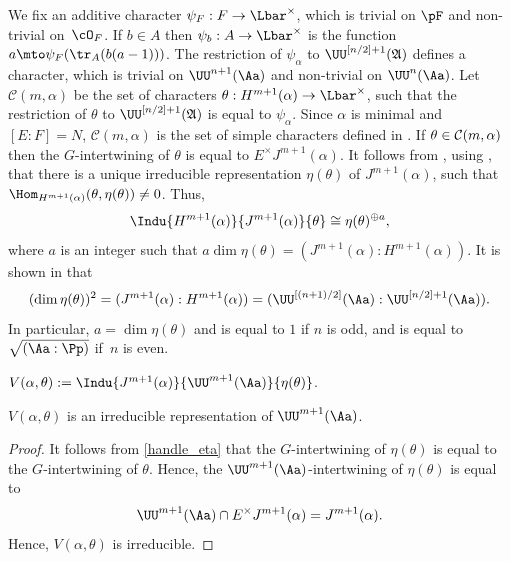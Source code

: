 We fix an additive character $\psi_F: F \to \Lbar^{\times}$, which is trivial on $\pF$ and non-trivial on~$\cO_F$. If $b\in A$ then $\psi_b: A\to \Lbar^{\times}$ is the function
$a\mto \psi_F(\tr_A(b(a-1)))$. The restriction of $\psi_{\alpha}$ to $\UU^{[n/2]+1}(\mathfrak A)$ defines a character, which is trivial on $\UU^{n+1}(\Aa)$ and non-trivial on $\UU^n(\Aa)$.
Let $\mathcal C(m, \alpha)$ be the set of characters \hbox{$\theta: H^{m+1}(\alpha)\to \Lbar^{\times}$}, such that the restriction of $\theta$ to $\UU^{[n/2]+1}(\mathfrak A)$ is equal to $\psi_{\alpha}$.
Since $\alpha$ is minimal and \hbox{$[E:F]=N$}, $\mathcal C(m, \alpha)$ is the set of simple characters defined in \cite[(3.2.1)]{BK}. If $\theta\in\nobreak \mathcal C(m, \alpha)$ then the $G$-intertwining of $\theta$ is
equal to $E^{\times} J^{m+1}(\alpha)$. It follows from \hbox{\cite[(8.3.3)]{BF}}, using \hbox{\cite[(3.4.1)]{BK}}, that there is a unique irreducible representation $\eta(\theta)$ of $J^{m+1}(\alpha)$, such that
$\Hom_{H^{m+1}(\alpha)}(\theta, \eta(\theta))\neq 0$. Thus,
\begin{equation}\label{handle_eta}
\Indu{H^{m+1}(\alpha)}{J^{m+1}(\alpha)}{\theta}\cong \eta(\theta)^{\oplus a},
\end{equation}
where $a$ is an integer such that $a \dim \eta(\theta)= (J^{m+1}(\alpha): H^{m+1}(\alpha))$. It is shown in \hbox{\cite[(8.3.3)]{BF}} that
\begin{equation}\label{dim_eta}
(\dim \eta(\theta))^2= (J^{m+1}(\alpha): H^{m+1}(\alpha))=(\UU^{[(n+1)/2]}(\Aa): \UU^{[n/2]+1}(\Aa)).
\end{equation}
In particular, $a=\dim \eta(\theta)$ and is equal to $1$ if $n$ is odd, and is equal to $\sqrt{(\Aa: \Pp)}$ if~$n$ is even.

\begin{defi}
$V(\alpha, \theta):=\Indu{J^{m+1}(\alpha)}{\UU^{m+1}(\Aa)}{\eta(\theta)}$.
\end{defi}

\begin{lem} $V(\alpha, \theta)$ is an irreducible representation of $\UU^{m+1}(\Aa)$.
\end{lem}

\begin{proof} It follows from \eqref{handle_eta} that the $G$-intertwining of $\eta(\theta)$ is equal to the $G$\nobreakdash-inter\-twining of $\theta$. Hence,
the $\UU^{m+1}(\Aa)$-intertwining of $\eta(\theta)$ is equal to
\[
\UU^{m+1}(\Aa)\cap E^{\times} J^{m+1}(\alpha)= J^{m+1}(\alpha).
\]
Hence,
$V(\alpha, \theta)$ is irreducible.
\end{proof}

